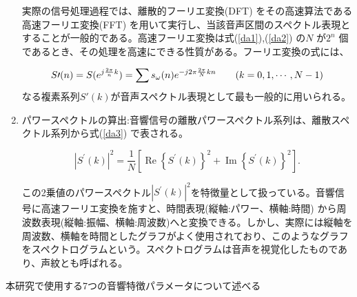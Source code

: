 \begin{enumerate}
実際の信号処理過程では、離散的フーリエ変換(DFT) をその高速算法である高速フーリエ変換(FFT) を用いて実行し、当該音声区間のスペクトル表現とすることが一般的である。高速フーリエ変換は式(\ref{da1}),(\ref{da2}) の$N$ が$2^n$ 個であるとき、その処理を高速にできる性質がある。フーリエ変換の式には、

\begin{equation}
S\prime(n)=S(e^{j\frac{2\pi}{n}k})=\sum s_\omega(n)e^{-j2\pi \frac{2\pi}{N}kn} \qquad (k=0,1,\cdots,N-1) \notag
\end{equation}
なる複素系列$S\prime(k)$が音声スペクトル表現として最も一般的に用いられる。

\item パワースペクトルの算出:音響信号の離散パワースペクトル系列は、離散スペクトル系列から式(\ref{da3}) で表される。

\begin{equation}
\label{da3}
|S^\prime(k)|^2=\frac{1}{N}[\operatorname{Re}\left\{S^\prime(k)\right\}^2+\operatorname{Im}\left\{S^\prime(k)\right\}^2].
\end{equation}

この2乗値のパワースペクトル$|S^\prime(k)|^2$を特徴量として扱っている。音響信号に高速フーリエ変換を施すと、時間表現(縦軸:パワー、横軸:時間) から周波数表現(縦軸:振幅、横軸:周波数)へと変換できる。しかし、実際には縦軸を周波数、横軸を時間としたグラフがよく使用されており、このようなグラフをスペクトログラムという。スペクトログラムは音声を視覚化したものであり、声紋とも呼ばれる。

\end{enumerate}\par

\par
本研究で使用する7つの音響特徴パラメータについて述べる\cite{shimae_10}

